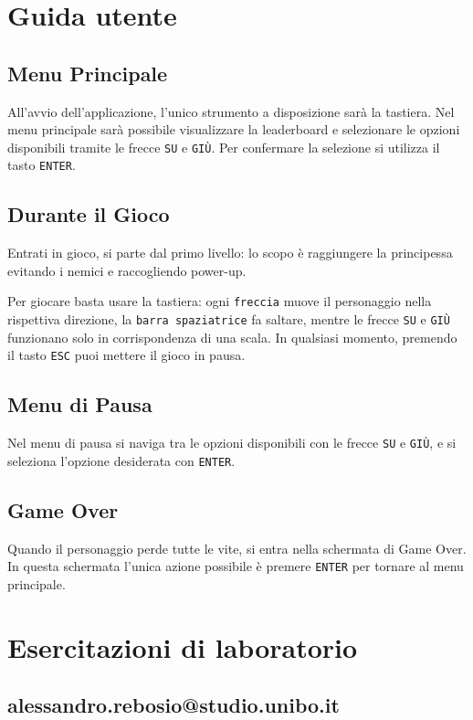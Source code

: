 \documentclass[a4paper,12pt]{report}
\begin{document}
\appendix
\chapter{Guida utente}

\section{Menu Principale}
All'avvio dell'applicazione, l'unico strumento a disposizione sarà la tastiera. Nel menu principale sarà possibile visualizzare la leaderboard e selezionare le opzioni disponibili tramite le frecce \texttt{SU} e \texttt{GIÙ}. Per confermare la selezione si utilizza il tasto \texttt{ENTER}.

\section{Durante il Gioco}
Entrati in gioco, si parte dal primo livello: lo scopo è raggiungere la principessa evitando i nemici e raccogliendo power-up.

Per giocare basta usare la tastiera: ogni \texttt{freccia} muove il personaggio nella rispettiva direzione, la \texttt{barra spaziatrice} fa saltare, mentre le frecce \texttt{SU} e \texttt{GIÙ} funzionano solo in corrispondenza di una scala. In qualsiasi momento, premendo il tasto \texttt{ESC} puoi mettere il gioco in pausa.

\section{Menu di Pausa}
Nel menu di pausa si naviga tra le opzioni disponibili con le frecce \texttt{SU} e \texttt{GIÙ}, e si seleziona l'opzione desiderata con \texttt{ENTER}.

\section{Game Over}
Quando il personaggio perde tutte le vite, si entra nella schermata di Game Over. In questa schermata l'unica azione possibile è premere \texttt{ENTER} per tornare al menu principale.

\chapter{Esercitazioni di laboratorio}
\section{alessandro.rebosio@studio.unibo.it}
\end{document}
